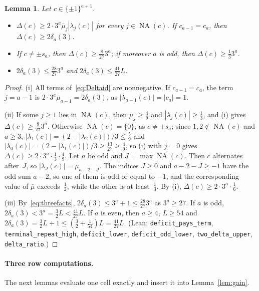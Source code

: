 \documentclass[11pt]{article}
\newtheorem{lemma}[theorem]{Lemma}
\theoremstyle{remark}
\newcommand{\NA}{\operatorname{NA}}
\begin{document}
\begin{lemma}\label{lem:deficit3}
Let $c\in\{\pm1\}^{a+1}$.
\begin{itemize}
\item[(i)] $\Delta(c)\ge2\cdot3^a\bar\mu_j|\lambda_j(c)|$ for every $j\in\NA(c)$.
 If $c_{a-1}=c_a$, then $\Delta(c)\ge2\delta_a(3)$.
\item[(ii)] If $c\ne\pm s_a$, then $\Delta(c)\ge\frac8{27}3^a$; if moreover $a$ is
 odd, then $\Delta(c)\ge\frac13 3^a$.
\item[(iii)] $2\delta_a(3)\le\frac{28}{27}3^a$ and $2\delta_a(3)\le\frac{41}{27}L$.
\end{itemize}
\end{lemma}
\begin{proof}
(i) All terms of~\eqref{eq:Deltaid} are nonnegative. If $c_{a-1}=c_a$, the term
$j=a-1$ is $2\cdot3^a\bar\mu_{a-1}=2\delta_a(3)$, as $|\lambda_{a-1}(c)|=|c_a|=1$.

(ii) If some $j\ge1$ lies in $\NA(c)$, then $\bar\mu_j\ge\frac49$ and
$|\lambda_j(c)|\ge\frac13$, and (i) gives $\Delta(c)\ge\frac8{27}3^a$. Otherwise
$\NA(c)=\{0\}$, as $c\ne\pm s_a$; since $1,2\notin\NA(c)$ and $a\ge3$,
$|\lambda_1(c)|=(2-|\lambda_2(c)|)/3\le\frac59$ and
$|\lambda_0(c)|=(2-|\lambda_1(c)|)/3\ge\frac{13}{27}\ge\frac49$, so (i) with $j=0$
gives $\Delta(c)\ge2\cdot3^a\cdot\frac13\cdot\frac49$. Let $a$ be odd and
$J=\max\NA(c)$. Then $c$ alternates after~$J$, so $|\lambda_J(c)|=\bar\mu_{a-2-J}$.
The indices $J\ge0$ and $a-2-J\ge-1$ have the odd sum $a-2$, so one of them is odd
or equal to $-1$, and the corresponding value of $\bar\mu$ exceeds~$\frac12$,
while the other is at least~$\frac13$. By (i),
$\Delta(c)\ge2\cdot3^a\cdot\frac16$.

(iii) By~\eqref{eq:threefacts}, $2\delta_a(3)\le3^a+1\le\frac{28}{27}3^a$ as
$3^a\ge27$. If $a$ is odd, $2\delta_a(3)<3^a=\frac32L<\frac{41}{27}L$. If $a$ is
even, then $a\ge4$, $L\ge54$ and $2\delta_a(3)=\frac32L+1\le(\frac32+\frac1{54})L
=\frac{41}{27}L$. (Lean: \texttt{deficit\_pays\_term},
\texttt{terminal\_repeat\_high}, \texttt{deficit\_lower},
\texttt{deficit\_odd\_lower}, \texttt{two\_delta\_upper}, \texttt{delta\_ratio}.)
\end{proof}

\paragraph{Three row computations.} The next lemmas evaluate one cell exactly and
insert it into Lemma~\ref{lem:gain}.
\end{document}
